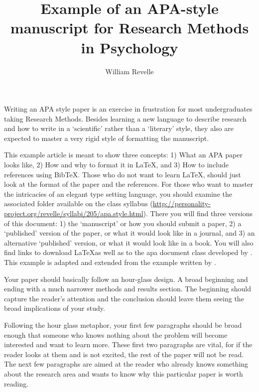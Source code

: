 \documentclass[doc]{apa}%
\title{Example of an APA-style manuscript for Research Methods in Psychology}
\author{William Revelle}
\affiliation{Department of Psychology \\ Northwestern University}
\begin{document}
\maketitle   
Writing an APA style paper is an exercise in frustration for most undergraduates taking Research Methods.  Besides learning a new language to describe research and how to write in a `scientific' rather than a `literary' style, they also are expected to master a very rigid style of formatting the manuscript.  

This example article is meant to show three concepts: 1) What an APA paper looks like, 2) How and why to  format it in \LaTeX, and 3) How to include references using Bib\TeX.  Those who do not want to learn \LaTeX, should just  look at the format of the paper and the references.  For those who want to master the intricacies of an elegant type setting language, you should examine the associated folder available on the class syllabus (\url{http://personality-project.org/revelle/syllabi/205/apa.style.html}).   There you will find three versions of this document: 1)  the `manuscript' or how you should submit a paper,  2) a `published' version of the paper, or what it would look like in a journal, and 3) an alternative `published' version, or what it would look like in a book. You will also find links to download \LaTeX as well as to the apa document class developed by . This example is adapted and extended from the example written by  .  

Your paper should basically follow an hour-glass design.  A broad beginning and ending with a much narrower methods and results section.  The beginning should capture the reader's attention and the conclusion should leave them seeing the broad implications of your study.  

Following the hour glass metaphor, your first few paragraphs should be broad enough that someone who knows nothing about the problem will become interested and want to learn more. These first two paragraphs are vital, for if the reader looks at them and is not excited, the rest of the paper will not be read. The next few paragraphs are aimed at the reader who already knows something about the research area and wants to know why this particular paper is worth reading.  



          
\end{document}
